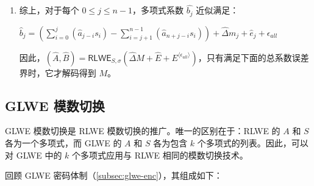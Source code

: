 \begin{enumerate}
$=  \left(\sum\limits_{i=0}^{j}(\hat{a}_{j-i}s_i) 
- \sum\limits_{i=j+1}^{n-1}(\hat{a}_{n+j-i}s_i)\right)
+ \hat{\Delta} m_j + \hat{e}_j 
+ \left(\epsilon_{b_j} - \epsilon_{e_j}
- \sum\limits_{i=0}^{j}(\epsilon_{a_{j-i}} s_i)
+ \sum\limits_{i=j+1}^{n-1}(\epsilon_{a_{n+j-i}} s_i)\right) + \hat{q} \cdot c_j
$

$=  \left(\sum\limits_{i=0}^{j}(\hat{a}_{j-i}s_i) 
- \sum\limits_{i=j+1}^{n-1}(\hat{a}_{n+j-i}s_i)\right)
+ \hat{\Delta} m_j + \hat{e}_j 
+ \epsilon_{\textit{all}} \in \mathbb{Z}_{\hat{q}}
$

\textcolor{red}{ $\rhd$ 其中 $\epsilon_{\textit{all}} = \epsilon_{b_j} - \epsilon_{e_j}
- \sum\limits_{i=0}^{j}(\epsilon_{a_{j-i}} s_i)
+ \sum\limits_{i=j+1}^{n-1}(\epsilon_{a_{n+j-i}} s_i)$}


$ $

\item 综上，对于每个 $0 \leq j \leq n-1 $，多项式系数 $\hat{b_j}$ 近似满足：

$\hat{b}_j =  \left(\sum\limits_{i=0}^{j}(\hat{a}_{j-i}s_i) 
- \sum\limits_{i=j+1}^{n-1}(\hat{a}_{n+j-i}s_i)\right)
+ \hat{\Delta} m_j + \hat{e}_j 
+ \epsilon_{\textit{all}}$



因此，$(\hat{A}, \hat{B}) = \textsf{RLWE}_{{S},\sigma}(\hat{\Delta} M + \hat{E} + E^{\langle \epsilon_{\textit{all}} \rangle})$，只有满足下面的总系数误差界时，它才解码得到 $M$。

\begin{flushright}
\qedsymbol{} 
\end{flushright}

\end{enumerate}




\subsection{GLWE 模数切换}
\label{subsec:modulus-switch-glwe}

GLWE 模数切换是 RLWE 模数切换的推广。唯一的区别在于：RLWE 的 $A$ 和 $S$ 各为一个多项式，而 GLWE 的 $A$ 和 $S$ 各为包含 $k$ 个多项式的列表。因此，可以对 GLWE 中的 $k$ 个多项式应用与 RLWE 相同的模数切换技术。

回顾 GLWE 密码体制（\autoref{subsec:glwe-enc}），其组成如下：

